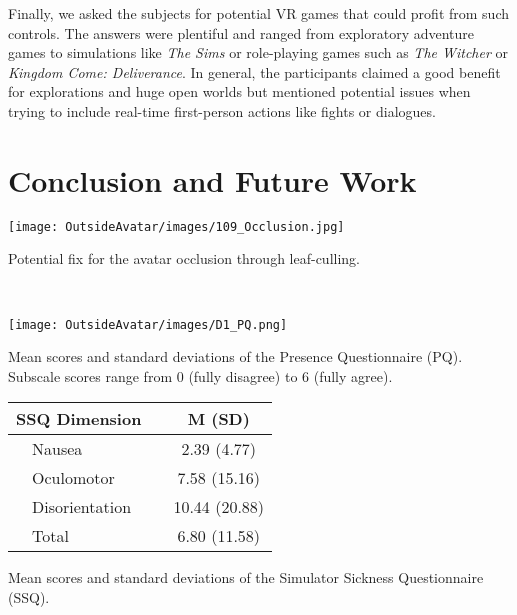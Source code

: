 \documentclass[sigchi-a, authorversion]{acmart}
\begin{document}
Finally, we asked the subjects for potential VR games that could profit from such controls. The answers were plentiful and ranged from exploratory adventure games to simulations like \textit{The Sims} or role-playing games such as \textit{The Witcher} or \textit{Kingdom Come: Deliverance}. In general, the participants claimed a good benefit for explorations and huge open worlds but mentioned potential issues when trying to include real-time first-person actions like fights or dialogues.


\section{Conclusion and Future Work}

\begin{marginfigure}
\vspace{-4em}
    \texttt{[image: OutsideAvatar/images/109\_Occlusion.jpg]}
    \caption{Potential fix for the avatar occlusion through leaf-culling.}~\label{fig:occlusion}
\end{marginfigure}

\begin{marginfigure}
\texttt{[image: OutsideAvatar/images/D1\_PQ.png]}
\vspace{-2em}
\caption{Mean scores and standard deviations of the Presence Questionnaire (PQ). Subscale scores range from 0 (fully disagree) to 6 (fully agree).}
  \label{tab:PQ}
\vspace{0.5em}
\end{marginfigure}


\begin{margintable}
  
  \begin{tabularx}{\marginparwidth}{lXc}
    \toprule
    SSQ Dimension & & M (SD)\\
    \midrule
    \ \ Nausea & & 2.39 (4.77)\\
    \ \ Oculomotor & & 7.58 (15.16)\\
    \ \ Disorientation & & 10.44 (20.88)\\
    \ \ Total & & 6.80 (11.58)\\
  \bottomrule
\end{tabularx}
\vspace{0.5em}
\caption{Mean scores and standard deviations of the Simulator Sickness Questionnaire (SSQ).}
  \label{tab:SSQ}
\end{margintable}
\end{document}
